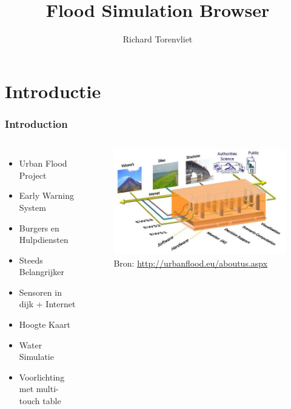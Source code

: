\documentclass[10pt,a4paper]{beamer}
\author{Richard Torenvliet}
\title{Flood Simulation Browser}
\begin{document}
\begin{frame}
\maketitle
\end{frame}
\begin{frame}
\tableofcontents
\end{frame}
\section{Introductie}
\begin{frame}
\frametitle{Introduction}
\begin{columns}[c]
\column{1.5in}
\begin{itemize}
\item Urban Flood Project
\item Early Warning System
\item Burgers en Hulpdiensten
\item Steeds Belangrijker
\item Sensoren in dijk + Internet
\item Hoogte Kaart
\item Water Simulatie
\item Voorlichting met multi-touch table
\end{itemize}
\column{2.0in}
\begin{figure}
\includegraphics[scale=0.3]{concept.png}
\caption{Bron: \url{http://urbanflood.eu/aboutus.aspx}}
\end{figure}
\end{columns}
\end{frame}
\end{document}
